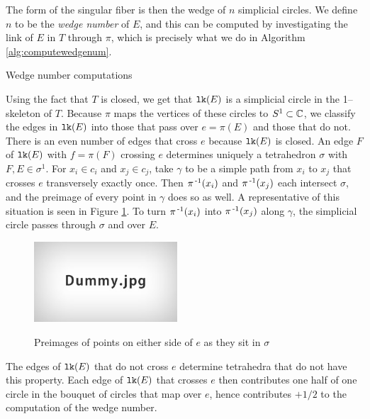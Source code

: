 The form of the singular fiber is then the wedge of $n$ simplicial circles.
We define $n$ to be the \emph{wedge number} of $E$, and this can be computed by investigating the link of $E$ in $T$ through $\pi$, which is precisely what we do in Algorithm \ref{alg:computewedgenum}.

\begin{algorithm}[h]
	\caption{Wedge number computations}
	\label{alg:computewedgenum}
\end{algorithm}

Using the fact that $T$ is closed, we get that $\texttt{lk}(E)$ is a simplicial circle in the 1--skeleton of $T$.
Because $\pi$ maps the vertices of these circles to $S^1\subset\mathbb{C}$, we classify the edges in $\texttt{lk}(E)$ into those that pass over $e=\pi(E)$ and those that do not.
There is an even number of edges that cross $e$ because $\texttt{lk}(E)$ is closed.
An edge $F$ of $\texttt{lk}(E)$ with $f=\pi(F)$ crossing $e$ determines uniquely a tetrahedron $\sigma$ with $F,E\in\sigma^1$.
For $x_i\in c_i$ and $x_j\in c_j$, take $\gamma$ to be a simple path from $x_i$ to $x_j$ that crosses $e$ transversely exactly once.
Then $\pi^{\,\text{-}1}(x_i)$ and $\pi^{\,\text{-}1}(x_j)$ each intersect $\sigma$, and the preimage of every point in $\gamma$ does so as well.
A representative of this situation is seen in Figure \ref{fig:gammapullback}.
To turn $\pi^{\,\text{-}1}(x_i)$ into $\pi^{\,\text{-}1}(x_j)$ along $\gamma$, the simplicial circle passes through $\sigma$ and over $E$.

\begin{figure}
	\centering
	\captionsetup{justification=centering}
	\caption{Preimages of points on either side of $e$ as they sit in $\sigma$}
	\includegraphics[height=3cm]{figures/dummy.jpg}
	\label{fig:gammapullback}
\end{figure}

The edges of $\texttt{lk}(E)$ that do not cross $e$ determine tetrahedra that do not have this property.
Each edge of $\texttt{lk}(E)$ that crosses $e$ then contributes one half of one circle in the bouquet of circles that map over $e$, hence contributes $+1/2$ to the computation of the wedge number.

